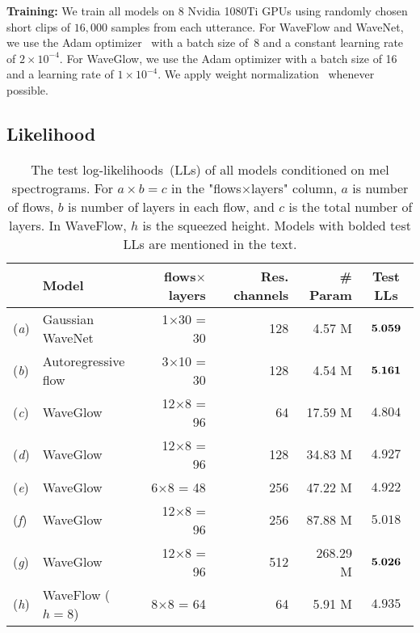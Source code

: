 \documentclass{article}
\begin{document}
\vspace{-.3em}
{\bf Training:} 
We train all models on 8 Nvidia 1080Ti GPUs using
randomly chosen short clips of $16,000$ samples from each utterance.
For WaveFlow and WaveNet, we use the Adam optimizer~\citep{kingma2014adam} with a batch size of~8 and a constant learning rate of $2\times10^{-4}$.
For WaveGlow, we use the Adam optimizer with a batch size of 16 and a learning rate of $1\times10^{-4}$.
We apply weight normalization~\citep{salimans2016weight}  whenever possible.

\vspace{-.2em}
\subsection{Likelihood}
\vspace{-.1em}
\begin{table*}[t]
\centering
\caption{The test log-likelihoods~(LLs) of all models conditioned on mel spectrograms.
For $a\times b = c$ in the {"flows$\times$layers"} column, $a$ is number of flows, $b$ is number of layers in each flow, and $c$ is the total number of layers.
In WaveFlow, $h$ is the squeezed height. Models with bolded test LLs are mentioned in the text.}
\vspace{0.25em}
\begin{tabular}{l|l|r|r|r|c}
\hline 
& \textbf{Model} & \textbf{flows$\times$layers} & \textbf{Res. channels} &  \textbf{\# Param} 
& \textbf{Test LLs}   \\ \hline
(\emph{a}) & Gaussian WaveNet   & 1$\times$30 = 30  \qquad & 128 \qquad & 4.57 M \qquad &  $\bf{5.059}$  \\
(\emph{b}) & Autoregressive flow  & 3$\times$10 = 30  \qquad & 128 \qquad & 4.54 M \qquad &  $\bf{5.161}$  \\
(\emph{c}) & WaveGlow   & 12$\times$8 = 96 \qquad & 64  \qquad & 17.59 M \qquad  &   $4.804$  \\
(\emph{d}) & WaveGlow  & 12$\times$8 = 96  \qquad & 128 \qquad & 34.83 M \qquad &   $4.927$  \\
(\emph{e}) & WaveGlow  & 6$\times$8 = 48  \qquad & 256 \qquad &  47.22 M \qquad &   $4.922$  \\
(\emph{f}) & WaveGlow  & 12$\times$8 = 96  \qquad & 256 \qquad & 87.88 M \qquad &   $5.018$  \\
(\emph{g}) & WaveGlow  & 12$\times$8 = 96  \qquad & 512 \qquad & 268.29 M \qquad &  $\bf{5.026}$ \\ 
(\emph{h}) & WaveFlow ($h = 8$)  & 8$\times$8 = 64  \qquad & 64 \qquad & 5.91 M \qquad &  $4.935$  \\

\end{tabular}
\end{table*}
\end{document}
